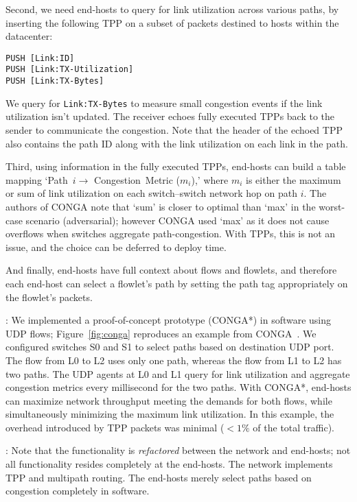\begin{ecam}
Second, we need end-hosts to query for link utilization across various paths,
by inserting the following TPP on a subset of packets destined to hosts
within the datacenter:
\begin{verbatim}
PUSH [Link:ID]
PUSH [Link:TX-Utilization]
PUSH [Link:TX-Bytes]
\end{verbatim}

We query for {\tt Link:TX-Bytes} to measure small
congestion events if the link utilization isn't updated.  The receiver echoes
fully executed TPPs back to the
sender to communicate the congestion.  Note that the header of the echoed TPP
also contains the path ID along with the link utilization on each link in the path.

Third, using information in the fully executed TPPs, end-hosts can build a
table mapping `Path~$i\rightarrow$ Congestion~Metric ($m_i$),' where $m_i$
is either the maximum or sum of link utilization on each switch--switch
network hop on path $i$.  The authors of CONGA note that `sum' is closer to
optimal than `max' in the worst-case scenario (adversarial);
however CONGA used `max' as it does not cause overflows when switches aggregate
path-congestion.  With TPPs, this is not an issue, and the choice can be deferred
to deploy time.

And finally, end-hosts have full context about flows and flowlets, and
therefore each end-host can select a flowlet's path by setting the
path tag appropriately on the flowlet's packets.

:  We implemented a proof-of-concept prototype (CONGA*) in software using UDP flows;
Figure~\ref{fig:conga} reproduces an example from CONGA~\cite[Figure~4]{conga}.
We configured switches S0 and S1 to select paths based on destination UDP
port.  The flow from L0 to L2 uses only one path, whereas the
flow from L1 to L2 has two paths.  The UDP agents at L0 and L1 query
for link utilization and aggregate congestion metrics every millisecond
for the two paths.  With CONGA*, end-hosts can maximize network
throughput meeting the demands for both flows, while simultaneously minimizing
the maximum link utilization.  In this example, the overhead introduced by
TPP packets was minimal ($< 1\%$ of the total traffic).

: Note that the functionality is \emph{refactored}
between the network and end-hosts; not all functionality resides completely
 at the end-hosts.  The network implements TPP and multipath
routing.  The end-hosts merely select paths based on congestion completely
in software.
\end{ecam}

